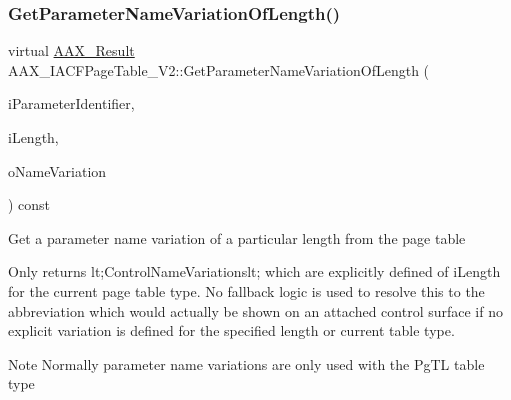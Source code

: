 \subsubsection{\texorpdfstring{GetParameterNameVariationOfLength()}{GetParameterNameVariationOfLength()}}
{\footnotesize\ttfamily virtual \mbox{\hyperlink{a00392_a4d8f69a697df7f70c3a8e9b8ee130d2f}{A\+A\+X\+\_\+\+Result}} A\+A\+X\+\_\+\+I\+A\+C\+F\+Page\+Table\+\_\+\+V2\+::\+Get\+Parameter\+Name\+Variation\+Of\+Length (\begin{DoxyParamCaption}\item[{\mbox{\hyperlink{a00392_ab4e01b971dac1b25632fd9f710dd8f77}{A\+A\+X\+\_\+\+C\+Page\+Table\+Param\+ID}}}]{i\+Parameter\+Identifier,  }\item[{int32\+\_\+t}]{i\+Length,  }\item[{\mbox{\hyperlink{a01873}{A\+A\+X\+\_\+\+I\+String}} \&}]{o\+Name\+Variation }\end{DoxyParamCaption}) const\hspace{0.3cm}{\ttfamily [pure virtual]}}





Get a parameter name variation of a particular length from the page table

Only returns {\ttfamily lt;Control\+Name\+Variationslt;} which are explicitly defined of {\ttfamily i\+Length} for the current page table type. No fallback logic is used to resolve this to the abbreviation which would actually be shown on an attached control surface if no explicit variation is defined for the specified length or current table type.

\begin{DoxyNote}{Note}
Normally parameter name variations are only used with the {\ttfamily \textquotesingle{}Pg\+TL\textquotesingle{}} table type
\end{DoxyNote}

